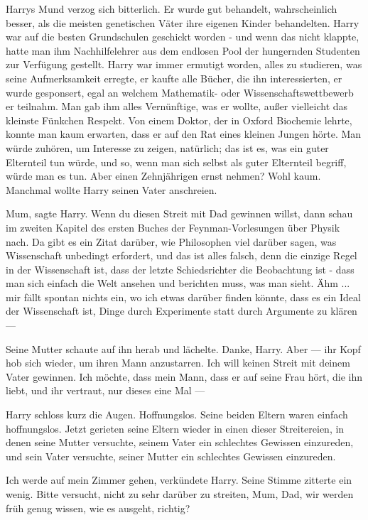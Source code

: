 Harrys Mund verzog sich bitterlich. Er wurde gut behandelt, wahrscheinlich
besser, als die meisten genetischen Väter ihre eigenen Kinder behandelten. Harry
war auf die besten Grundschulen geschickt worden - und wenn das nicht klappte,
hatte man ihm Nachhilfelehrer aus dem endlosen Pool der hungernden Studenten zur
Verfügung gestellt. Harry war immer ermutigt worden, alles zu studieren, was
seine Aufmerksamkeit erregte, er kaufte alle Bücher, die ihn interessierten, er
wurde gesponsert, egal an welchem Mathematik- oder Wissenschaftswettbewerb er
teilnahm. Man gab ihm alles Vernünftige, was er wollte, außer vielleicht das
kleinste Fünkchen Respekt. Von einem Doktor, der in Oxford Biochemie lehrte,
konnte man kaum erwarten, dass er auf den Rat eines kleinen Jungen hörte. Man
würde zuhören, um Interesse zu zeigen, natürlich; das ist es, was ein guter
Elternteil tun würde, und so, wenn man sich selbst als guter Elternteil begriff,
würde man es tun. Aber einen Zehnjährigen ernst nehmen? Wohl kaum. Manchmal
wollte Harry seinen Vater anschreien.

\glqq Mum\grqq{}, sagte Harry. \glqq Wenn du diesen Streit mit Dad gewinnen
willst, dann schau im zweiten Kapitel des ersten Buches der Feynman-Vorlesungen
über Physik nach. Da gibt es ein Zitat darüber, wie Philosophen viel darüber
sagen, was Wissenschaft unbedingt erfordert, und das ist alles falsch, denn die
einzige Regel in der Wissenschaft ist, dass der letzte Schiedsrichter die
Beobachtung ist - dass man sich einfach die Welt ansehen und berichten muss, was
man sieht. Ähm ... mir fällt spontan nichts ein, wo ich etwas darüber finden
könnte, dass es ein Ideal der Wissenschaft ist, Dinge durch Experimente statt
durch Argumente zu klären ---\grqq{}

Seine Mutter schaute auf ihn herab und lächelte. \glqq Danke, Harry. Aber
---\grqq{} ihr Kopf hob sich wieder, um ihren Mann anzustarren. \glqq Ich will
keinen Streit mit deinem Vater gewinnen. Ich möchte, dass mein Mann, dass er auf
seine Frau hört, die ihn liebt, und ihr vertraut, nur dieses eine Mal ---\grqq{}

Harry schloss kurz die Augen. Hoffnungslos. Seine beiden Eltern waren einfach
hoffnungslos. Jetzt gerieten seine Eltern wieder in einen dieser Streitereien,
in denen seine Mutter versuchte, seinem Vater ein schlechtes Gewissen
einzureden, und sein Vater versuchte, seiner Mutter ein schlechtes Gewissen
einzureden.

\glqq Ich werde auf mein Zimmer gehen\grqq{}, verkündete Harry. Seine Stimme
zitterte ein wenig. \glqq Bitte versucht, nicht zu sehr darüber zu streiten,
Mum, Dad, wir werden früh genug wissen, wie es ausgeht, richtig?\grqq{}

